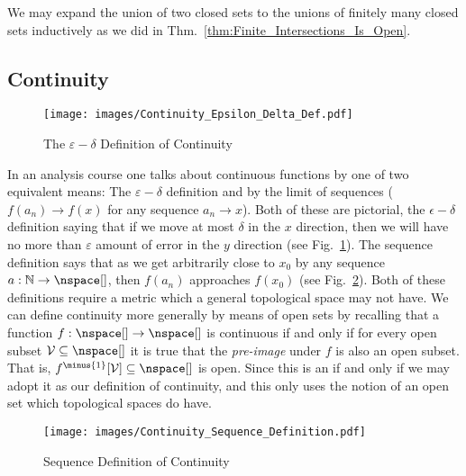 \documentclass{book}                                                           %
\begin{document}
                We may expand the union of two closed sets to the unions of
                finitely many closed sets inductively as we did in
                Thm.~\ref{thm:Finite_Intersections_Is_Open}.
            \newpage
            \subsection{Continuity}
                \begin{figure}
                    \centering
                    \captionsetup{type=figure}
                    \texttt{[image: images/Continuity\_Epsilon\_Delta\_Def.pdf]}
                    \caption{The $\varepsilon-\delta$ Definition of Continuity}
                    \label{fig:Eps_Delta_Def_Cont}
                \end{figure}
                In an analysis course one talks about continuous functions by
                one of two equivalent means: The $\varepsilon-\delta$ definition
                and by the limit of sequences ($f(a_{n})\rightarrow{f}(x)$ for
                any sequence $a_{n}\rightarrow{x}$). Both of these are
                pictorial, the $\epsilon-\delta$ definition saying that if we
                move at most $\delta$ in the $x$ direction, then we will have
                no more than $\varepsilon$ amount of error in the $y$ direction
                (see Fig.~\ref{fig:Eps_Delta_Def_Cont}). The sequence definition
                says that as we get arbitrarily close to $x_{0}$ by any sequence
                $a:\mathbb{N}\rightarrow\nspace[]$, then $f(a_{n})$ approaches
                $f(x_{0})$ (see Fig.~\ref{fig:Sequence_Def_Continuity}).
                Both of these definitions require a metric which a general
                topological space may not have. We can define continuity more
                generally by means of open sets by recalling that a function
                $f:\nspace[]\rightarrow\nspace[]$ is continuous if and only if
                for every open subset $\mathcal{V}\subseteq\nspace[]$ it is true
                that the \textit{pre-image} under $f$ is also an open subset.
                That is, $f^{\minus{1}}[\mathcal{V}]\subseteq\nspace[]$ is open.
                Since this is an if and only if we may adopt it as our
                definition of continuity, and this only uses the notion of an
                open set which topological spaces do have.
                \begin{figure}
                    \centering
                    \captionsetup{type=figure}
                    \texttt{[image: images/Continuity\_Sequence\_Definition.pdf]}
                    \caption{Sequence Definition of Continuity}
                    \label{fig:Sequence_Def_Continuity}
                \end{figure}
\end{document}
